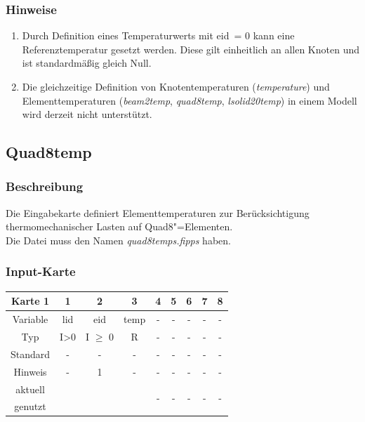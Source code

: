 \documentclass[11pt,titlepage,listof=totoc,bibliography=totoc,twoside]{scrreprt}
\begin{document}
{{\subsubsection{Hinweise}

\begin{enumerate}
 \item Durch Definition eines Temperaturwerts mit eid~= 0 kann eine Referenztemperatur gesetzt werden. Diese gilt einheitlich an allen Knoten und ist standardmäßig gleich Null.
 \item Die gleichzeitige Definition von Knotentemperaturen (\emph{temperature}) und Elementtemperaturen (\emph{beam2temp}, \emph{quad8temp}, \emph{lsolid20temp}) in einem Modell wird derzeit nicht unterstützt.
\end{enumerate}

\newpage

\subsection{Quad8temp}

\subsubsection{Beschreibung}

Die Eingabekarte definiert Elementtemperaturen zur Berücksichtigung thermomechanischer Lasten auf Quad8"=Elementen.\\
Die Datei muss den Namen \emph{quad8temps.fipps} haben.

\subsubsection{Input-Karte}

\begin{table}[htbp]
\centering
\begin{tabularx}{\textwidth}{cCCCCCCCC}
\toprule
Karte 1         & 1     & 2          & 3          & 4  & 5  & 6  & 7  & 8  \\
\midrule
Variable        & lid   & eid        & temp       & -  & -  & -  & -  & -  \\
Typ             & I>0   & I $\geq$ 0 & R          & -  & -  & -  & -  & -  \\
Standard        & -     & -          & -          & -  & -  & -  & -  & -  \\
Hinweis         & -     & 1          & -          & -  & -  & -  & -  & -  \\
aktuell         &  &  &  &   &   &   &   &   \\
genutzt \\
\bottomrule
\end{tabularx}
\end{table}

}}
\end{document}
